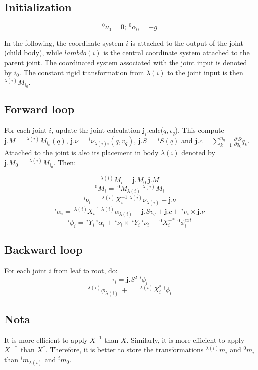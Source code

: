 \documentclass[11pt,twoside,a4paper]{article}
\newcommand{\dpartial}[2]{\frac{\partial{#1}}{\partial{#2}}}
\begin{document}
\subsection{Initialization} 
$$^0\nu_0 = 0 ; \ ^0\alpha_0 = -g$$

In the following, the coordinate system $i$ is attached to the output of the joint (child body), while $lambda(i)$ is the central coordinate system attached to the parent joint. The coordinated system associated with the joint input is denoted by $i_0$. The constant rigid transformation from $\lambda(i)$ to the joint input is then $^{\lambda(i)}M_{i_0}$.


\subsection{Forward loop} 
For each joint $i$, update the joint calculation $\mathbf j_i$.calc($q,v_q$). This compute $\mathbf{j}.M = \ ^{\lambda(i)}M_{i_0}(q)$, $\mathbf{j}.\nu = \ ^i\nu_{{\lambda(i)}i}(q,v_q)$, $\mathbf{j}.S = \ ^iS(q)$  and $\mathbf{j}.c = \sum_{k=1}^{n_q} \dpartial{^iS}{q_k} \dot q_k$. Attached to the joint is also its placement in body $\lambda(i)$ denoted by $\mathbf{j}.M_0 =\ ^{\lambda(i)}M_{i_0}$. Then:

$$^{\lambda(i)}M_i = \mathbf{j}.M_0 \ \mathbf{j}.M $$
$$^0M_i = \ ^0M_{\lambda(i)} \ ^{\lambda(i)}M_i$$
$$^i\nu_{i}= \ ^{\lambda(i)}X_i^{-1} \ ^{\lambda(i)}\nu_{{\lambda(i)}} + \mathbf{j}.\nu$$
$$^i\alpha_{i}= \ ^{\lambda(i)}X_i^{-1} \  ^{\lambda(i)}\alpha_{{\lambda(i)}} + \mathbf{j}.S \dot v_q + \mathbf{j}.c +  \ ^i\nu_{i} \times  \mathbf{j}.\nu$$
$$^i\phi_i= \ ^iY_i \ ^i\alpha_i + \ ^i\nu_i \times \ ^iY_i \ ^i\nu_i - \ ^0X_i^{-*}\ ^0\phi_i^{ext}$$

\subsection{Backward loop} 
For each joint $i$ from leaf to root, do:
$$\tau_i = \mathbf{j}.S^T \ ^i\phi_i$$
$$^{\lambda(i)}\phi_{\lambda(i)} \ +\!\!= \ ^{\lambda(i)}X_i^{*} \ ^i\phi_i$$

\subsection{Nota}
It is more efficient to apply $X^{-1}$ than $X$. Similarly, it is more efficient to apply $X^{-*}$ than $X^*$. Therefore, it is better to store the transformations $^{\lambda(i)}m_i$ and $^0m_i$ than $^im_{\lambda(i)}$ and $^im_0$.
\end{document}
